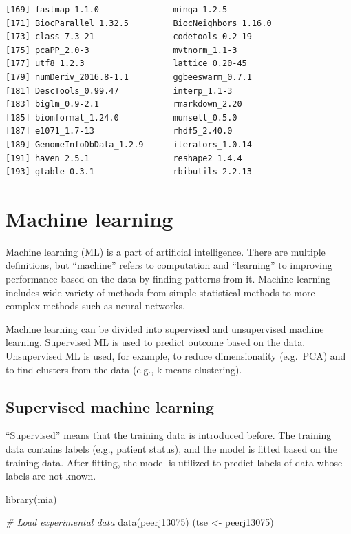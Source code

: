 \documentclass[
]{book}
\newenvironment{Shaded}{\begin{snugshade}}{\end{snugshade}}
\newcommand{\CommentTok}[1]{\textcolor[rgb]{0.56,0.35,0.01}{\textit{#1}}}
\newcommand{\FunctionTok}[1]{\textcolor[rgb]{0.00,0.00,0.00}{#1}}
\newcommand{\NormalTok}[1]{#1}
\newcommand{\OtherTok}[1]{\textcolor[rgb]{0.56,0.35,0.01}{#1}}
\begin{document}
\begin{verbatim}
[169] fastmap_1.1.0               minqa_1.2.5                
[171] BiocParallel_1.32.5         BiocNeighbors_1.16.0       
[173] class_7.3-21                codetools_0.2-19           
[175] pcaPP_2.0-3                 mvtnorm_1.1-3              
[177] utf8_1.2.3                  lattice_0.20-45            
[179] numDeriv_2016.8-1.1         ggbeeswarm_0.7.1           
[181] DescTools_0.99.47           interp_1.1-3               
[183] biglm_0.9-2.1               rmarkdown_2.20             
[185] biomformat_1.24.0           munsell_0.5.0              
[187] e1071_1.7-13                rhdf5_2.40.0               
[189] GenomeInfoDbData_1.2.9      iterators_1.0.14           
[191] haven_2.5.1                 reshape2_1.4.4             
[193] gtable_0.3.1                rbibutils_2.2.13           
\end{verbatim}

\hypertarget{machine_learning}{%
\chapter{Machine learning}\label{machine_learning}}

Machine learning (ML) is a part of artificial intelligence. There are multiple
definitions, but ``machine'' refers to computation and ``learning'' to improving
performance based on the data by finding patterns from it. Machine learning
includes wide variety of methods from simple statistical methods to more
complex methods such as neural-networks.

Machine learning can be divided into supervised and unsupervised machine learning.
Supervised ML is used to predict outcome based on the data. Unsupervised ML is used,
for example, to reduce dimensionality (e.g.~PCA) and to find clusters from the
data (e.g., k-means clustering).

\hypertarget{supervised-machine-learning}{%
\section{Supervised machine learning}\label{supervised-machine-learning}}

``Supervised'' means that the training data is introduced before. The training data
contains labels (e.g., patient status), and the model is fitted based on the
training data. After fitting, the model is utilized to predict labels of data whose
labels are not known.

\begin{Shaded}
\begin{Highlighting}[]
\FunctionTok{library}\NormalTok{(mia)}

\CommentTok{\# Load experimental data}
\FunctionTok{data}\NormalTok{(peerj13075)}
\NormalTok{(tse }\OtherTok{\textless{}{-}}\NormalTok{ peerj13075)}
\end{Highlighting}
\end{Shaded}
\end{document}
